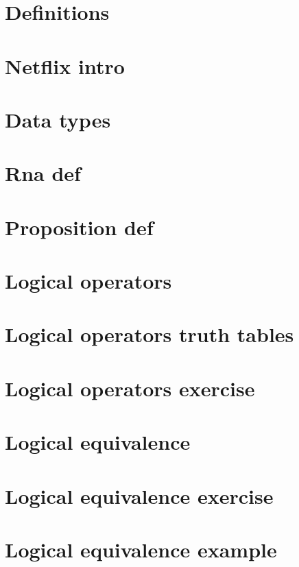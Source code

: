 
\section*{Definitions}

\vfill
\section*{Netflix intro}

\vfill
\section*{Data types}

\vfill
\section*{Rna def}

\vfill
\section*{Proposition def}

\vfill
\section*{Logical operators}

\vfill
\section*{Logical operators truth tables}

\vfill
\section*{Logical operators exercise}

\vfill
\section*{Logical equivalence}

\vfill
\section*{Logical equivalence exercise}

\vfill
\section*{Logical equivalence example}

\vfill

